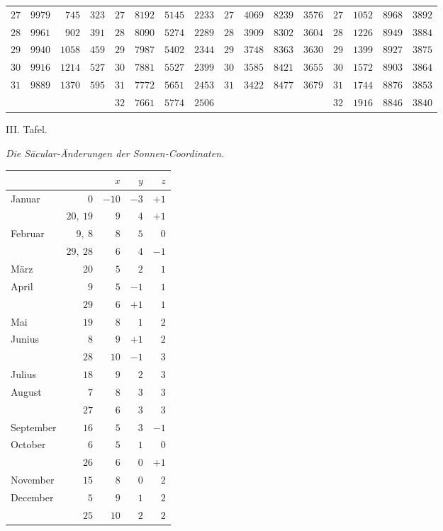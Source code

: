\begin{center}
\begin{tabular}{r|r|r|r||r|r|r|r||r|r|r|r||r|r|r|r}
$27$ & $9979$ & $745$ & $323$ & $27$ & $8192$ & $5145$ & $2233$ & $27$ & $4069$ & $8239$ & $3576$ & $27$ & $1052$ & $8968$ & $3892$\\
$28$ & $9961$ & $902$ & $391$ & $28$ & $8090$ & $5274$ & $2289$ & $28$ & $3909$ & $8302$ & $3604$ & $28$ & $1226$ & $8949$ & $3884$\\
$29$ & $9940$ & $1058$ & $459$ & $29$ & $7987$ & $5402$ & $2344$ & $29$ & $3748$ & $8363$ & $3630$ & $29$ & $1399$ & $8927$ & $3875$\\
$30$ & $9916$ & $1214$ & $527$ & $30$ & $7881$ & $5527$ & $2399$ & $30$ & $3585$ & $8421$ & $3655$ & $30$ & $1572$ & $8903$ & $3864$\\[3pt]
$31$ & $9889$ & $1370$ & $595$ & $31$ & $7772$ & $5651$ & $2453$ & $31$ & $3422$ & $8477$ & $3679$ & $31$ & $1744$ & $8876$ & $3853$\\
 &  &  &  & $32$ & $7661$ & $5774$ & $2506$ &  &  &  &  & $32$ & $1916$ & $8846$ & $3840$\\
\end{tabular}\endgroup
\end{center}
\clearpage
{}%
\begin{center}
III. Tafel.

\medskip\emph{Die Säcular-Änderungen der Sonnen-Coordinaten.}\medskip

\begin{tabular}{lr|r|r|r}
&&$x$&$y$&$z$\\\hline
Januar &$0$&$-10$&$-3$&$+1$\\
&$20,\ 19$&$9$&$4$&$+1$\\
Februar &$9,\ 8$&$8$&$5$&$0$\\
&$29,\ 28$&$6$&$4$&$-1$\\
März &$20$&$5$&$2$&$1$\\
April &$9$&$5$&$-1$&$1$\\
&$29$&$6$&$+1$&$1$\\
Mai &$19$&$8$&$1$&$2$\\
Junius &$8$&$9$&$+1$&$2$\\
&$28$&$10$&$-1$&$3$\\
Julius &$18$&$9$&$2$&$3$\\
August &$7$&$8$&$3$&$3$\\
&$27$&$6$&$3$&$3$\\
September &$16$&$5$&$3$&$-1$\\
October &$6$&$5$&$1$&$0$\\
&$26$&$6$&$0$&$+1$\\
November &$15$&$8$&$0$&$2$\\
December &$5$&$9$&$1$&$2$\\
&$25$&$10$&$2$&$2$
\end{tabular}
\end{center}
